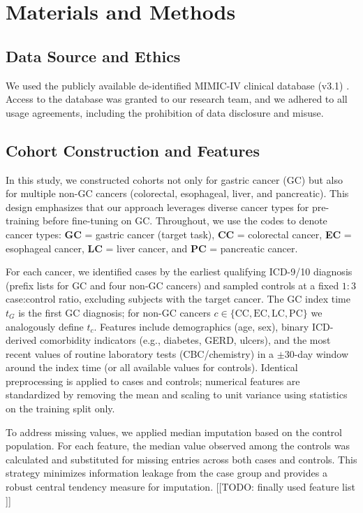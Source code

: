 \documentclass[journal,article,submit,pdftex,moreauthors]{Definitions/mdpi}
\begin{document}


\section{Materials and Methods}

\subsection{Data Source and Ethics}
We used the publicly available de-identified MIMIC-IV clinical database (v3.1) \citep{Johnson2024MIMICIV}.
Access to the database was granted to our research team, and we adhered to all usage agreements, including the prohibition of data disclosure and misuse.

\subsection{Cohort Construction and Features}
In this study, we constructed cohorts not only for gastric cancer (GC) but also for multiple non-GC cancers (colorectal, esophageal, liver, and pancreatic).
This design emphasizes that our approach leverages diverse cancer types for pre-training before fine-tuning on GC.
Throughout, we use the codes to denote cancer types: \textbf{GC} = gastric cancer (target task), \textbf{CC} = colorectal cancer, \textbf{EC} = esophageal cancer, \textbf{LC} = liver cancer, and \textbf{PC} = pancreatic cancer.

For each cancer, we identified cases by the earliest qualifying ICD-9/10 diagnosis (prefix lists for GC and four non-GC cancers) and sampled controls at a fixed $1{:}3$ case:control ratio, excluding subjects with the target cancer.
The GC index time $t_G$ is the first GC diagnosis; for non-GC cancers $c\in\{\mathrm{CC},\mathrm{EC},\mathrm{LC},\mathrm{PC}\}$ we analogously define $t_c$.
Features include demographics (age, sex), binary ICD-derived comorbidity indicators (e.g., diabetes, GERD, ulcers), and the most recent values of routine laboratory tests (CBC/chemistry) in a $\pm 30$-day window around the index time (or all available values for controls).
Identical preprocessing is applied to cases and controls; numerical features are standardized by removing the mean and scaling to unit variance using statistics on the training split only.

To address missing values, we applied median imputation based on the control population. 
For each feature, the median value observed among the controls was calculated and substituted for missing entries across both cases and controls. 
This strategy minimizes information leakage from the case group and provides a robust central tendency measure for imputation.
[[TODO: finally used feature list ]]
\end{document}
